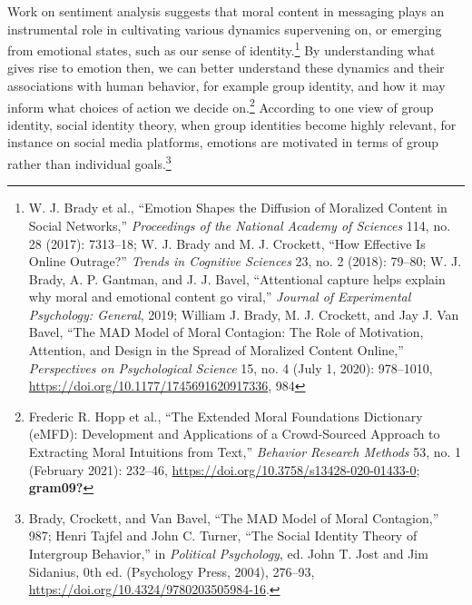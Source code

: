 \documentclass[phdthesis,12pt,final]{wuthesis}
\theoremstyle{definition}
\theoremstyle{definition}
\theoremstyle{definition}
\theoremstyle{definition}
\theoremstyle{remark}
\begin{document}
Work on sentiment analysis suggests that moral content in messaging plays an instrumental role in cultivating various dynamics supervening on, or emerging from emotional states, such as our sense of identity.\footnote{W. J. Brady et al., {``Emotion Shapes the Diffusion of Moralized Content in Social Networks,''} \emph{Proceedings of the National Academy of Sciences} 114, no. 28 (2017): 7313--18; W. J. Brady and M. J. Crockett, {``How Effective Is Online Outrage?''} \emph{Trends in Cognitive Sciences} 23, no. 2 (2018): 79--80; W. J. Brady, A. P. Gantman, and J. J. Bavel, {``Attentional capture helps explain why moral and emotional content go viral,''} \emph{Journal of Experimental Psychology: General}, 2019; William J. Brady, M. J. Crockett, and Jay J. Van Bavel, {``The {MAD} Model of Moral Contagion: The Role of Motivation, Attention, and Design in the Spread of Moralized Content Online,''} \emph{Perspectives on Psychological Science} 15, no. 4 (July 1, 2020): 978--1010, \url{https://doi.org/10.1177/1745691620917336}, 984} By understanding what gives rise to emotion then, we can better understand these dynamics and their associations with human behavior, for example group identity, and how it may inform what choices of action we decide on.\footnote{Frederic R. Hopp et al., {``The Extended {Moral Foundations Dictionary} ({eMFD}): {Development} and Applications of a Crowd-Sourced Approach to Extracting Moral Intuitions from Text,''} \emph{Behavior Research Methods} 53, no. 1 (February 2021): 232--46, \url{https://doi.org/10.3758/s13428-020-01433-0}; \textbf{gram09?}} According to one view of group identity, social identity theory, when group identities become highly relevant, for instance on social media platforms, emotions are motivated in terms of group rather than individual goals.\footnote{Brady, Crockett, and Van Bavel, {``The {MAD} Model of Moral Contagion,''} 987; Henri Tajfel and John C. Turner, {``The {Social Identity Theory} of {Intergroup Behavior},''} in \emph{Political {Psychology}}, ed. John T. Jost and Jim Sidanius, 0th ed. (Psychology Press, 2004), 276--93, \url{https://doi.org/10.4324/9780203505984-16}.}
\end{document}
